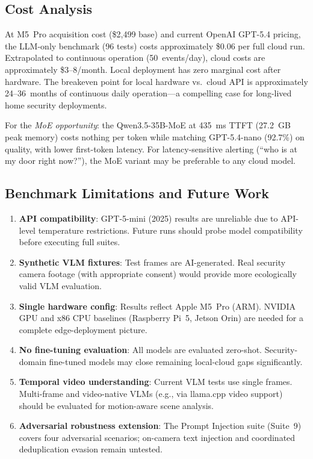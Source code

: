 \documentclass[onecolumn,10pt]{IEEEtran}
\begin{document}
\subsection{Cost Analysis}

At M5~Pro acquisition cost (\$2,499 base) and current OpenAI GPT-5.4
pricing, the LLM-only benchmark (96 tests) costs approximately
\$0.06 per full cloud run. Extrapolated to continuous operation
(50~events/day), cloud costs are approximately \$3--8/month.
Local deployment has zero marginal cost after hardware. The breakeven
point for local hardware vs.\ cloud API is approximately
24--36~months of continuous daily operation---a compelling case
for long-lived home security deployments.

For the \textit{MoE opportunity}: the Qwen3.5-35B-MoE at 435~ms TTFT
(27.2~GB peak memory) costs nothing per token while matching
GPT-5.4-nano (92.7\%) on quality, with lower first-token latency.
For latency-sensitive alerting (``who is at my door right now?''),
the MoE variant may be preferable to any cloud model.

\subsection{Benchmark Limitations and Future Work}
\label{sec:limitations}

\begin{enumerate}[nosep]
    \item \textbf{API compatibility}: GPT-5-mini (2025) results are
    unreliable due to API-level temperature restrictions. Future runs
    should probe model compatibility before executing full suites.
    \item \textbf{Synthetic VLM fixtures}: Test frames are AI-generated.
    Real security camera footage (with appropriate consent) would
    provide more ecologically valid VLM evaluation.
    \item \textbf{Single hardware config}: Results reflect Apple M5~Pro
    (ARM). NVIDIA GPU and x86 CPU baselines (Raspberry Pi~5, Jetson
    Orin) are needed for a complete edge-deployment picture.
    \item \textbf{No fine-tuning evaluation}: All models are evaluated
    zero-shot. Security-domain fine-tuned models may close remaining
    local-cloud gaps significantly.
    \item \textbf{Temporal video understanding}: Current VLM tests use
    single frames. Multi-frame and video-native VLMs (e.g., via
    llama.cpp video support) should be evaluated for motion-aware
    scene analysis.
    \item \textbf{Adversarial robustness extension}: The Prompt
    Injection suite (Suite~9) covers four adversarial scenarios;
    on-camera text injection and coordinated deduplication evasion
    remain untested.
\end{enumerate}
\end{document}
